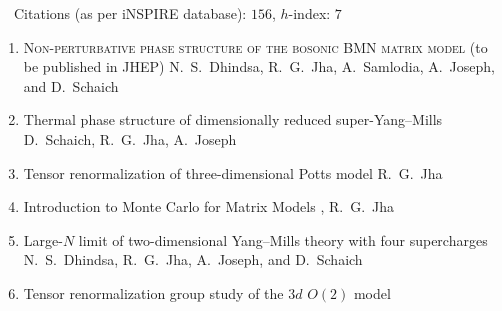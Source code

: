  {\faLeanpub}
~~Citations (as per iNSPIRE database): $156$, $h$-index: $7$
\begin{enumerate}
\item \textsc{Non-perturbative phase structure of the bosonic BMN matrix model}  \newline 
\hfill  {} (to be published in JHEP) \newline 
N.~S.~Dhindsa, R.~G.~Jha, A.~Samlodia, A.~Joseph, and D.~Schaich
\vspace{1mm} 
\item Thermal phase structure of dimensionally reduced super-Yang--Mills \newline 
{} \newline 
D.~Schaich, R.~G.~Jha, A.~Joseph
\vspace{1mm} 
\item Tensor renormalization of three-dimensional Potts model  \newline 
{} \newline 
R.~G.~Jha
\vspace{1mm} 
 \item Introduction to Monte Carlo for Matrix Models \newline 
{},  \newline  
 R.~G.~Jha
 \vspace{1mm} 
 \item Large-$N$ limit of two-dimensional Yang--Mills theory with four supercharges \newline 
{} \newline 
 N.~S.~Dhindsa, R.~G.~Jha, A.~Joseph, and D.~Schaich
 \vspace{1mm}  
 \item Tensor renormalization group study of the $3d$ $O(2)$ model \newline 

\end{enumerate}

